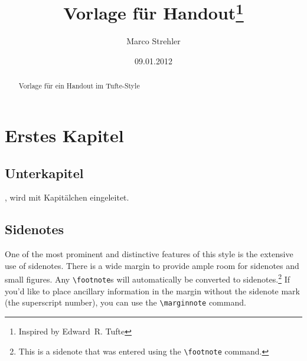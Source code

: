 \documentclass[a4paper]{tufte-handout}
\title{Vorlage für Handout\thanks{Inspired by Edward~R. Tufte}}
\author[M. Strehler]{Marco Strehler}
\date{09.01.2012}
\begin{document}
\maketitle%

\begin{abstract}
\noindent Vorlage für ein Handout im Tufte-Style
\end{abstract}


\section{Erstes Kapitel}\label{sec:erstes-kapitel}

\subsection{Unterkapitel}\label{sec:unterkapitel}

, wird mit Kapitälchen eingeleitet.

\subsection{Sidenotes}\label{sec:sidenotes}
One of the most prominent and distinctive features of this style is the
extensive use of sidenotes.  There is a wide margin to provide ample room
for sidenotes and small figures.  Any \Verb|\footnote|s will automatically
be converted to sidenotes.\footnote{This is a sidenote that was entered
using the \texttt{\textbackslash footnote} command.}  If you'd like to place ancillary
information in the margin without the sidenote mark (the superscript
number), you can use the \Verb|\marginnote| command.

\cite{Smid2011}



\end{document}
